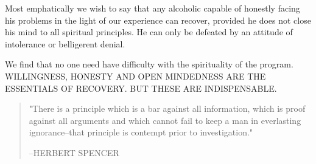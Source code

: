 \begin{biblechapter}
    Most emphatically we wish to say that 
    any alcoholic capable of honestly facing his problems 
    in the light of our experience 
    can recover, 
    provided he does not close his mind to all spiritual principles.
\verse He can only be defeated by an attitude of intolerance 
    or belligerent denial.

    We find that no one need have difficulty with 
    the spirituality of the program.
\verse WILLINGNESS, HONESTY AND OPEN MINDEDNESS ARE THE ESSENTIALS OF RECOVERY.
\verse BUT THESE ARE INDISPENSABLE.

\begin{quote}
\verse "There is a principle which is a bar against all information, 
    which is proof against all arguments 
    and which cannot fail to keep a man in everlasting ignorance--that 
    principle is contempt prior to investigation."

    \hfill{--HERBERT SPENCER}
\end{quote}
\end{biblechapter}

